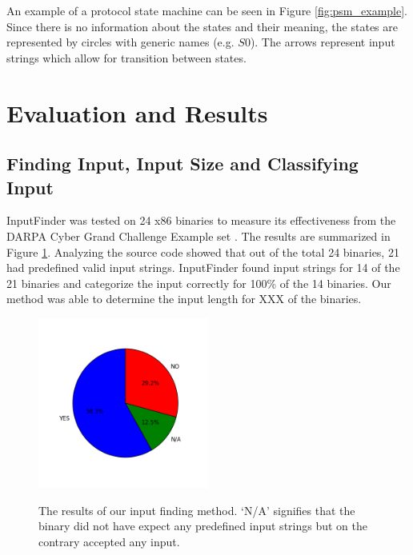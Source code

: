 \documentclass{acm_proc_article-sp}
\def \tool {InputFinder}
\def \numbinaries {24}
\begin{document}
An example of a protocol state machine can be seen in Figure \ref{fig:psm_example}.
Since there is no information about the states and their meaning, the states are represented by circles with generic names (e.g. $S0$).
The arrows represent input strings which allow for transition between states.

\section{Evaluation and Results} \label{results}
\subsection{Finding Input, Input Size and Classifying Input}
\tool{} was tested on \numbinaries{} x86 binaries to measure its effectiveness from the DARPA Cyber Grand Challenge Example set \cite{darpacgc}.
The results are summarized in Figure \ref{fig:findinputresults}.
Analyzing the source code showed that out of the total \numbinaries{} binaries, 21 had predefined valid input strings.
\tool{} found input strings for 14 of the 21 binaries and categorize the input correctly for 100\% of the 14 binaries.
Our method was able to determine the input length for XXX of the binaries.

\begin{figure}[h!]
\caption{The results of our input finding method. `N/A' signifies that the binary did not have expect any predefined input strings but on the contrary accepted any input.}
\centering
\includegraphics[width=0.5\textwidth]{findinputresults}
\label{fig:findinputresults}
\end{figure}
\end{document}

